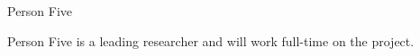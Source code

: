 \begin{participant}[type=R,PM=48,gender=female,salary=5500]{Person Five}

  Person Five is a leading researcher and will work full-time on the project.

\end{participant}

